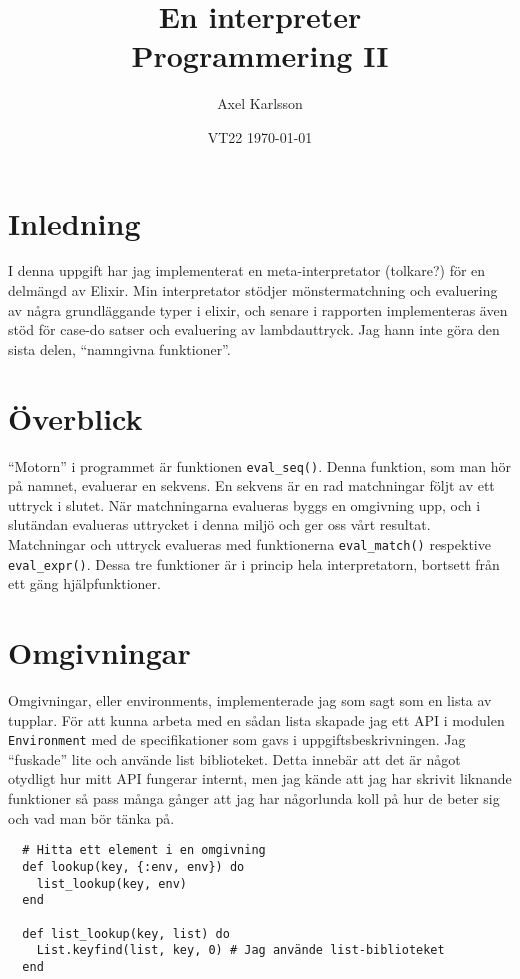 \documentclass[a4paper,11pt]{article}
\begin{document}
\title{
  \textbf{En interpreter\\
  \small Programmering II}
}
\author{Axel Karlsson}
\date{VT22 \today}

\maketitle

\section*{Inledning}
I denna uppgift har jag implementerat en meta-interpretator (tolkare?) för en delmängd av Elixir. Min interpretator stödjer mönstermatchning och evaluering av några grundläggande typer i elixir, och senare i rapporten implementeras även stöd för case-do satser och evaluering av lambdauttryck. Jag hann inte göra den sista delen, ``namngivna funktioner''.

\section*{Överblick}
``Motorn'' i programmet är funktionen {\tt eval\_seq()}. Denna funktion, som man hör på namnet, evaluerar en sekvens. En sekvens är en rad matchningar följt av ett uttryck i slutet. När matchningarna evalueras byggs en omgivning upp, och i slutändan evalueras uttrycket i denna miljö och ger oss vårt resultat. Matchningar och uttryck evalueras med funktionerna {\tt eval\_match()} respektive {\tt eval\_expr()}. Dessa tre funktioner är i princip hela interpretatorn, bortsett från ett gäng hjälpfunktioner.

\section*{Omgivningar}
Omgivningar, eller environments, implementerade jag som sagt som en lista av tupplar. För att kunna arbeta med en sådan lista skapade jag ett API i modulen {\tt Environment} med de specifikationer som gavs i uppgiftsbeskrivningen. Jag ``fuskade'' lite och använde list biblioteket. Detta innebär att det är något otydligt hur mitt API fungerar internt, men jag kände att jag har skrivit liknande funktioner så pass många gånger att jag har någorlunda koll på hur de beter sig och vad man bör tänka på.

\begin{verbatim}
  # Hitta ett element i en omgivning
  def lookup(key, {:env, env}) do
    list_lookup(key, env)
  end

  def list_lookup(key, list) do
    List.keyfind(list, key, 0) # Jag använde list-biblioteket
  end
\end{verbatim}
\end{document}
